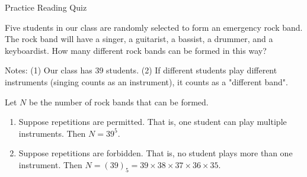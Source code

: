 \documentclass[dvipsnames, 10pt]{beamer}
\begin{document}
\begin{frame}{Practice Reading Quiz}
 \begin{myredbox}[title=Practice Reading Quiz (Lists)]
Five students in our class are randomly selected to form an emergency rock band.  The rock band will have a singer, a guitarist, a bassist, a drummer, and a keyboardist.  How many different rock bands can be formed in this way?  
\end{myredbox}
\vfill
\pause 
Notes: (1) Our class has 39 students. (2) If different students play different instruments (singing counts as an instrument), it counts as a "different band".
\vfill
\pause 
\small

 \begin{mygreenbox}[title=Solutions]

Let $N$ be the number of rock bands that can be formed.

\begin{enumerate}
	\item Suppose repetitions are permitted.  That is, one student can play multiple instruments.  Then \pause $N=39^5$. \pause 
	\item Suppose repetitions are forbidden. That is, no student plays more than one instrument.    Then \pause $N=(39)_5 = 39 \times 38 \times 37 \times 36 \times 35$.
\end{enumerate}

\end{mygreenbox}

\end{frame}


%
%
%
%	
\end{document}
